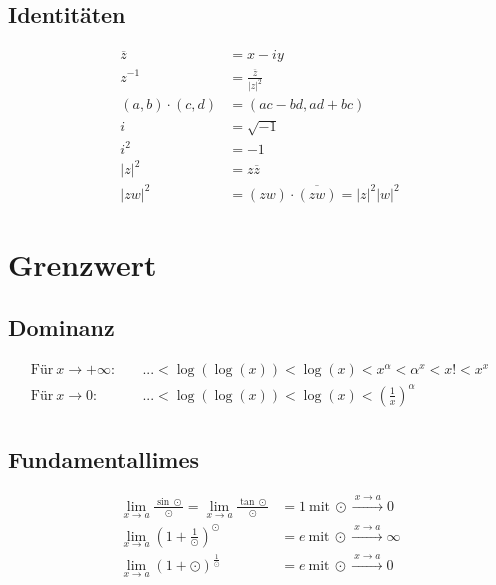 \documentclass[11pt]{article}
\begin{document}
\subsection{Identit{\"a}ten}

\begin{equation*}
\begin{split}
	\overline{z} & = x - iy\\
	z^{-1} & = \frac{\overline{z}}{|z|^2} \\
	(a,b) \cdot (c, d) & = (ac-bd, ad+bc) \\
	i & = \sqrt{-1}\\
	i^2 & = -1 \\
	|z|^2 & = z\overline{z} \\
	|zw|^2 & = (zw) \cdot \overline{(zw)} = |z|^2|w|^2
\end{split}
\end{equation*}

\section{Grenzwert}

\subsection{Dominanz}

\begin{equation*}
\begin{split}
	\text{F{\"u}r}\ x \to +\infty:\quad & ... < \log(\log(x)) < \log(x) < x^\alpha < \alpha^x < x! < x^x \\
	\text{F{\"u}r}\ x \to 0:\quad & ... < \log(\log(x)) < \log(x) < (\frac{1}{x})^\alpha \\
\end{split}
\end{equation*}

\subsection{Fundamentallimes}

\begin{equation*}
\begin{split}
	\lim_{x \to a} \frac{\sin \odot}{\odot} = \lim_{x \to a} \frac{\tan \odot}{\odot} & = 1\ \text{mit}\ \odot \xrightarrow{\: x \to a \: } 0 \\ 
	\lim_{x \to a} (1 + \frac{1}{\odot})^\odot & = e\ \text{mit}\ \odot \xrightarrow{\: x \to a \: } \infty \\ 
	\lim_{x \to a} (1 + \odot)^\frac{1}{\odot} & = e\ \text{mit}\ \odot \xrightarrow{\: x \to a \: } 0 \\ 
\end{split}
\end{equation*}
\end{document}

